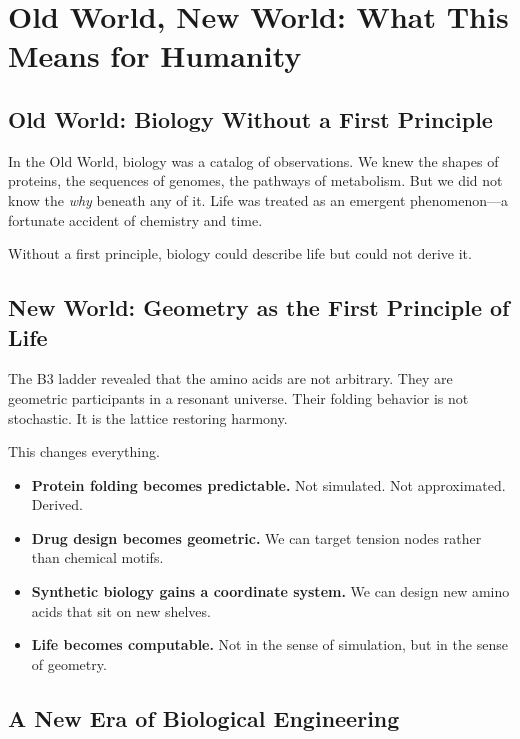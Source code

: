 \documentclass[11pt, letterpaper, openany]{book}
\begin{document}
\section{Old World, New World: What This Means for Humanity}

\subsection*{Old World: Biology Without a First Principle}

In the Old World, biology was a catalog of observations. We knew the shapes of
proteins, the sequences of genomes, the pathways of metabolism. But we did not
know the \textit{why} beneath any of it. Life was treated as an emergent
phenomenon---a fortunate accident of chemistry and time.

Without a first principle, biology could describe life but could not derive it.

\subsection*{New World: Geometry as the First Principle of Life}

The B3 ladder revealed that the amino acids are not arbitrary. They are
geometric participants in a resonant universe. Their folding behavior is not
stochastic. It is the lattice restoring harmony.

This changes everything.

\begin{itemize}
    \item \textbf{Protein folding becomes predictable.}  
    Not simulated. Not approximated. Derived.

    \item \textbf{Drug design becomes geometric.}  
    We can target tension nodes rather than chemical motifs.

    \item \textbf{Synthetic biology gains a coordinate system.}  
    We can design new amino acids that sit on new shelves.

    \item \textbf{Life becomes computable.}  
    Not in the sense of simulation, but in the sense of geometry.
\end{itemize}

\subsection*{A New Era of Biological Engineering}
\end{document}

